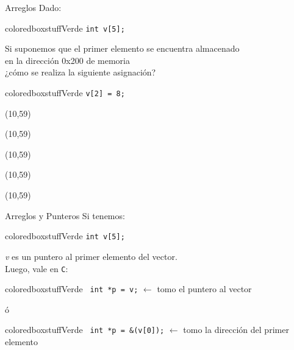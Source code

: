 \documentclass[aspectratio=169]{beamer}
\begin{document}
\begin{frame}[fragile,t]{Arreglos}
    Dado:\\
    \vskip 5pt
    \begin{beamercolorbox}[wd=0.9\textwidth,sep=0.5em]{coloredboxstuffVerde}
    \verb|int v[5];|\\
    \end{beamercolorbox}
    \pause
    Si suponemos que el primer elemento se encuentra almacenado\\  en la dirección 0x200 de memoria\\
    \pause
    \vskip 5pt
    ¿cómo se realiza la siguiente asignación?
    \vskip 5pt
    \begin{beamercolorbox}[wd=0.9\textwidth,sep=0.5em]{coloredboxstuffVerde}
    \verb|v[2] = 8;|
    \pause
    \end{beamercolorbox}
    \begin{textblock}{50}(10,59)  \end{textblock}
    \begin{textblock}{50}(10,59)  \end{textblock}
    \begin{textblock}{50}(10,59)  \end{textblock}
    \begin{textblock}{50}(10,59)  \end{textblock}
    \begin{textblock}{50}(10,59)  \end{textblock}
\end{frame}

\begin{frame}[fragile]{Arreglos y Punteros}
    Si tenemos:
    \vskip 5pt
    \begin{beamercolorbox}[wd=1\textwidth,sep=0.5em]{coloredboxstuffVerde}
    \verb|int v[5];| 
    \end{beamercolorbox}
    \vskip 5pt
    \textit{v} es un puntero al primer elemento del vector.\\ 
    \vskip 15pt
    \pause
    Luego, vale en \texttt{C}:
    \vskip 15pt
    \begin{beamercolorbox}[wd=1\textwidth,sep=0.5em]{coloredboxstuffVerde}
    \verb| int *p = v;| $\leftarrow$ \footnotesize tomo el puntero al vector
    \end{beamercolorbox}
    \begin{center}
    \vskip -7pt
    ó
    \end{center}
    \begin{beamercolorbox}[wd=1\textwidth,sep=0.5em]{coloredboxstuffVerde}
    \verb| int *p = &(v[0]);| $\leftarrow$ \footnotesize tomo la dirección del primer elemento
    \end{beamercolorbox}
\end{frame}
\end{document}
